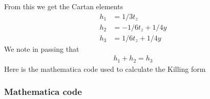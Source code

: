 \documentclass[a4paper,12pt]{article}
\begin{document}
From this we get the Cartan elements
\begin{equation}
	\begin{aligned}
		h_1&=1/3 t_z\\
		h_2&=-1/6t_z+1/4y\\
		h_3&=1/6t_z+1/4y
	\end{aligned}
\end{equation}
We note in passing that
\begin{equation}
	\begin{aligned}
		h_1+h_2=h_3
	\end{aligned}
\end{equation}
Here is the mathematica code used to calculate the Killing form
\subsubsection*{Mathematica code}
\end{document}
